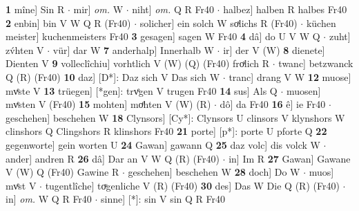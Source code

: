 \documentclass[8pt,a4paper,notitlepage]{article}
\begin{document}
\begin{table}[ht]
\begin{minipage}[t]{0.5\linewidth}
\textbf{1} mîne] Sin R  $\cdot$ mir] \textit{om.} W  $\cdot$ niht] \textit{om.} Q R Fr40  $\cdot$ halbez] halben R halbes Fr40 \textbf{2} enbin] bin V W Q R (Fr40)  $\cdot$ solicher] ein solch W soͯlichs R (Fr40)  $\cdot$ küchen meister] kuchenmeisters Fr40 \textbf{3} gesagen] sagen W Fr40 \textbf{4} dâ] do U V W Q  $\cdot$ zuht] zv́hten V  $\cdot$ vür] dar W \textbf{7} anderhalp] Innerhalb W  $\cdot$ ir] der V (W) \textbf{8} dienete] Dienten V \textbf{9} volleclîchiu] vorhtlich V (W) (Q) (Fr40) froͯlich R  $\cdot$ twanc] betzwanck Q (R) (Fr40) \textbf{10} daz] [D*]: Daz sich V Das sich W  $\cdot$ tranc] drang V W \textbf{12} muose] mvͤste V \textbf{13} trüegen] [*gen]: trvͤgen V trugen Fr40 \textbf{14} sus] Als Q  $\cdot$ muosen] mvͤsten V (Fr40) \textbf{15} mohten] moͤhten V (W) (R)  $\cdot$ dô] da Fr40 \textbf{16} ê] ie Fr40  $\cdot$ geschehen] beschehen W \textbf{18} Clynsors] [Cy*]: Clynsors U clinsors V klynshors W clinshors Q Clingshors R klinshors Fr40 \textbf{21} porte] [p*]: porte U pforte Q \textbf{22} gegenworte] gein worten U \textbf{24} Gawan] gawann Q \textbf{25} daz volc] dis volck W  $\cdot$ ander] andren R \textbf{26} dâ] Dar an V W Q (R) (Fr40)  $\cdot$ in] Im R \textbf{27} Gawan] Gawane V (W) Q (Fr40) Gawine R  $\cdot$ geschehen] beschehen W \textbf{28} doch] Do W  $\cdot$ muos] mvͤst V  $\cdot$ tugentlîche] toͮgenliche V (R) (Fr40) \textbf{30} des] Das W Die Q (R) (Fr40)  $\cdot$ in] \textit{om.} W Q R Fr40  $\cdot$ sinne] [*]: sin V sin Q R Fr40 \newline
\end{minipage}
\end{table}
\end{document}
